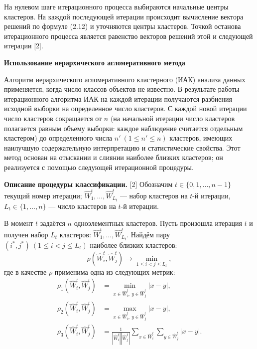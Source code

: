 \documentclass[14pt,a4paper]{extarticle}
\begin{document}
На нулевом шаге итерационного процесса выбираются начальные центры кластеров. На каждой последующей итерации происходит вычисление вектора решений по формуле (2.12) и уточняются центры кластеров. Точкой останова итерационного процесса является равенство векторов решений этой и следующей итерации [2].

\textbf{Использование иерархического агломеративного метода}

Алгоритм иерархического агломеративного кластерного (ИАК) анализа данных применяется, когда число классов объектов не известно. В результате работы итерационного алгоритма ИАК на каждой итерации получаются разбиения исходной выборки на определенное число кластеров. С каждой новой итерации число кластеров сокращается от $n$ (на начальной итерации число кластеров полагается равным объему выборки: каждое наблюдение считается отдельным кластером) до определенного числа $n'\ (1 \leq n' \leq n)$ кластеров, имеющих наилучшую содержательную интерпретацию и статистические свойства. Этот метод основан на отыскании и слиянии наиболее близких кластеров; он реализуется с помощью следующей итерационной процедуры.

\textbf{Описание процедуры классификации.} [2] Обозначим $t \in \{0,1,\ldots,n-1\}$ текущий номер итерации; $\hat{W}_{1}^{t},\ldots,\hat{W}_{L_{t}}^{t}$ --- набор кластеров на $t$-й итерации, $L_{t} \in \{1,\ldots,n\}$ --- число кластеров на $t$-й итерации.

В момент $t$ задаётся $n$ одноэлементных кластеров. Пусть произошла итерация $t$ и получен набор $L_{t}$ кластеров: $\hat{W}_{1}^{t},\ldots,\hat{W}_{L_{t}}^{t}$. Найдём пару $(i^{*},j^{*})\ (1 \leq i < j \leq L_{t})$ наиболее близких кластеров:
\begin{equation}
\rho\left( \hat{W}_{i}^{t},\hat{W}_{j}^{t} \right) \rightarrow \min_{1 \leq i < j \leq L_{t}},
\end{equation}
где в качестве $\rho$ применима одна из следующих метрик:
\begin{align}
\rho_{1}\left( \hat{W}_{i}^{t},\hat{W}_{j}^{t} \right) &= \min_{x \in \hat{W}_{i}^{t},\ y \in \hat{W}_{j}^{t}} |x - y|,\\
\rho_{2}\left( \hat{W}_{i}^{t},\hat{W}_{j}^{t} \right) &= \max_{x \in \hat{W}_{i}^{t},\ y \in \hat{W}_{j}^{t}} |x - y|,\\
\rho_{3}\left( \hat{W}_{i}^{t},\hat{W}_{j}^{t} \right) &= \frac{1}{|\hat{W}_{i}^{t}| |\hat{W}_{j}^{t}|} \sum_{x \in \hat{W}_{i}^{t}} \sum_{y \in \hat{W}_{j}^{t}} |x - y|.
\end{align}
\end{document}
